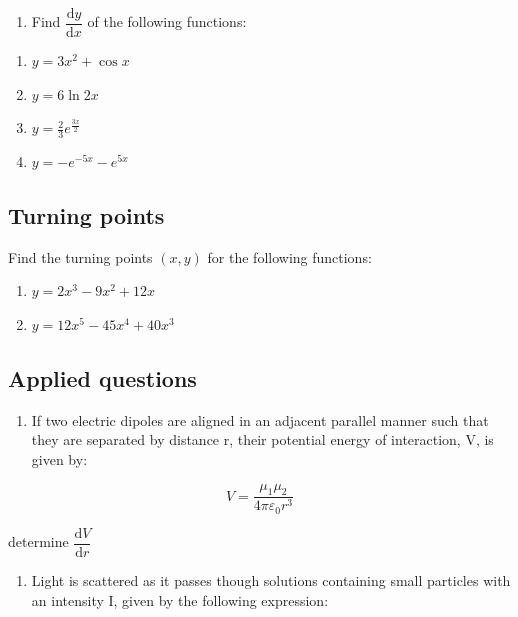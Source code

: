 \documentclass[
]{book}
\providecommand{\tightlist}{%
  \setlength{\itemsep}{0pt}\setlength{\parskip}{0pt}}
\begin{document}
\begin{enumerate}
\def\labelenumi{\arabic{enumi}.}
\setcounter{enumi}{1}
\tightlist
\item
  Find \(\dfrac{\textrm{d}y}{\textrm{d}x}\) of the following functions:
\end{enumerate}

\begin{enumerate}
\def\labelenumi{\alph{enumi}.}
\tightlist
\item
  \(y = 3x^2 + \cos x\)
\item
  \(y = 6 \ln 2x\)
\item
  \(y = \frac{2}{3}e^{\frac{3x}{2}}\)
\item
  \(y = -e^{-5x}-e^{5x}\)
\end{enumerate}

\hypertarget{turning-points}{%
\subsection{Turning points}\label{turning-points}}

Find the turning points \((x,y)\) for the following functions:

\begin{enumerate}
\def\labelenumi{\arabic{enumi}.}
\tightlist
\item
  \(y = 2x^3 - 9x^2 + 12x\)
\item
  \(y = 12x^5 - 45x^4 + 40x^3\)
\end{enumerate}

\hypertarget{applied-questions}{%
\subsection{Applied questions}\label{applied-questions}}

\begin{enumerate}
\def\labelenumi{\arabic{enumi}.}
\tightlist
\item
  If two electric dipoles are aligned in an adjacent parallel manner such that they are separated by distance r, their potential energy of interaction, V, is given by:
\end{enumerate}

\begin{equation*}
V = \frac{\mu_1 \mu_2}{4 \pi \varepsilon_0 r^3}
\end{equation*}

determine \(\dfrac{\textrm{d}V}{\textrm{d}r}\)

\begin{enumerate}
\def\labelenumi{\arabic{enumi}.}
\setcounter{enumi}{1}
\tightlist
\item
  Light is scattered as it passes though solutions containing small particles with an intensity I, given by the following expression:
\end{enumerate}
\end{document}
